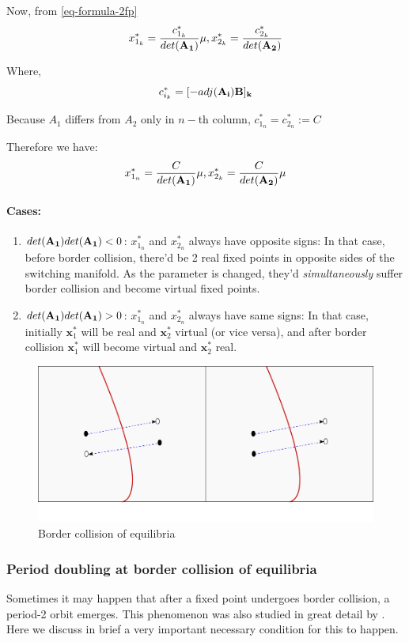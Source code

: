\documentclass{book}
\renewcommand{\(}{\begin{columns}}
\renewcommand{\)}{\end{columns}}
\newcommand{\<}[1]{\begin{column}{#1}}
\renewcommand{\>}{\end{column}}
\newcommand{\mb}[1]{\mathbf{#1}}
\newcommand{\para}{\paragraph}
\begin{document}
Now, from \eqref{eq-formula-2fp}
\begin{equation}
\label{eq-formula2-2fp}
x^*_{1_k}=\frac{c^*_{1_k}}{det(\bf{A_1})}\mu, x^*_{2_k}=\frac{c^*_{2_k}}{det(\bf{A_2})}
\end{equation}

Where, \[
c^*_{i_k}=[-adj(\bf{A_i)B}]_k
\]

Because $A_1$ differs from $A_2$ only in $n-$th column, $c^*_{1_n}=c^*_{2_n}:=C$

Therefore we have:
\begin{equation}
\label{eq-final-form-2fps}
x^*_{1_n}=\frac{C}{det(\bf{A_1})}\mu, x^*_{2_k}=\frac{C}{det(\bf{A_2})}\mu
\end{equation}

\para{Cases:\\}
\begin{enumerate}
\item $det({\bf A_1})det({\bf A_1})<0$:  $x^*_{1_n}$ and $x^*_{2_n}$ always have 
opposite signs:  In that case, before border collision, there'd be 2 real 
fixed points in opposite sides of the switching manifold. As the parameter is 
changed, they'd \emph{simultaneously} suffer border collision and become 
virtual fixed points.  
\item $det({\bf A_1})det({\bf A_1})>0$:  $x^*_{1_n}$ and $x^*_{2_n}$ always have 
same signs: In that case, initially $\mb{x}_1^*$ will be real and $\mb{x}_2^*$ 
virtual (or vice versa), and after border collision $\mb{x}_1^*$ will become virtual and $\mb{x}_2^*$ 
real.  
\end{enumerate}

\begin{figure}
\caption{Border collision of equilibria}
\begin{center}
\includegraphics[width=0.9\columnwidth]{cases}
\end{center}
\end{figure}

\subsubsection{Period doubling at border collision of equilibria}
Sometimes it may happen that after a fixed point undergoes border collision, a 
period-2 orbit emerges.  This phenomenon was also studied in great detail by \cite{feigin-1999}.
Here we discuss in brief a very important necessary condition for this to 
happen.  
\end{document}
